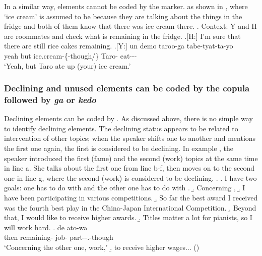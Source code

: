 In a similar way,
 elements cannot be coded by the marker.
as shown in \Next, where `ice cream' is assumed to be  because they are talking about the things in the fridge and both of them know that there was ice cream there.
%
\ex. Context:
	Y and H are roommates and check what is remaining in the fridge.
	\a.[H:] I'm sure that there are still rice cakes remaining.
	\bg.[Y:] un demo  taroo-ga tabe-tyat-ta-yo \\
		yeah but ice.cream-\{-though/\} Taro- eat--- \\
		`Yeah, but Taro ate up (your) ice cream.'


\subsubsection{Declining and unused elements can be coded by the copula followed by \textit{ga} or \textit{kedo}}

Declining elements can be coded by .
As discussed above,
there is no simple way to identify declining elements.
The declining status appears to be related to intervention of other topics;
when the speaker shifts one  to another  and mentions the first one again,
the first  is considered to be declining.
In example \Next,
the speaker introduced the first (fame) and the second (work) topics at the same time in line a.
She talks about the first one from line b-f,
then moves on to the second one in line g,
where the second  (work) is considered to be declining.
%
\ex.\label{sigoto2}
 \a. I have two goals: one has to do with  and the other one has to do with .
 \b. Concerning ,
 \b. I have been participating in various  competitions.
 \b. So far the best award I received was the fourth best play in the China-Japan International Competition.
 \b. Beyond that, I would like to receive higher awards.
 \b. Titles matter a lot for pianists, so I will work hard.
 \bg. de ato-wa   \\
 	then remaining- job- part--.-though \\
	`Concerning the other one, work,'
 \b. to receive higher wages...
\hfill{()}


%

